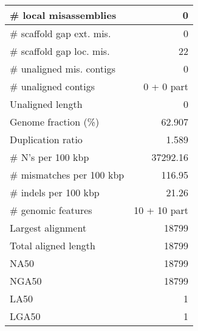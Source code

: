 \documentclass[12pt,a4paper]{article}
\begin{document}
\begin{table}[ht]
\begin{center}
\begin{tabular}{|l*{1}{|r}|}
\# local misassemblies & 0 \\ \hline
\# scaffold gap ext. mis. & 0 \\ \hline
\# scaffold gap loc. mis. & 22 \\ \hline
\# unaligned mis. contigs & 0 \\ \hline
\# unaligned contigs & 0 + 0 part \\ \hline
Unaligned length & 0 \\ \hline
Genome fraction (\%) & 62.907 \\ \hline
Duplication ratio & 1.589 \\ \hline
\# N's per 100 kbp & 37292.16 \\ \hline
\# mismatches per 100 kbp & 116.95 \\ \hline
\# indels per 100 kbp & 21.26 \\ \hline
\# genomic features & 10 + 10 part \\ \hline
Largest alignment & 18799 \\ \hline
Total aligned length & 18799 \\ \hline
NA50 & 18799 \\ \hline
NGA50 & 18799 \\ \hline
LA50 & 1 \\ \hline
LGA50 & 1 \\ \hline
\end{tabular}
\end{center}
\end{table}
\end{document}
